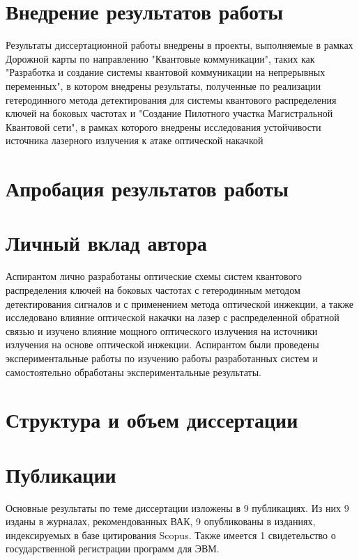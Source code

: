 \section*{Внедрение результатов работы}
Результаты диссертационной работы внедрены в проекты, выполняемые в рамках Дорожной карты по направлению "Квантовые коммуникации", таких как  "Разработка и создание системы квантовой коммуникации на непрерывных переменных", в котором внедрены результаты, полученные по реализации гетеродинного метода детектирования для системы квантового распределения ключей на боковых частотах  и "Создание Пилотного участка Магистральной Квантовой сети", в рамках которого внедрены исследования устойчивости источника лазерного излучения к атаке оптической накачкой

\section*{Апробация результатов работы}
\section*{Личный вклад автора}
Аспирантом лично разработаны оптические схемы систем квантового распределения ключей на боковых частотах с гетеродинным методом детектирования сигналов и с применением метода оптической инжекции, а также исследовано влияние оптической накачки на лазер с распределенной обратной связью и изучено влияние мощного оптического излучения на источники излучения на основе оптической инжекции. Аспирантом были проведены экспериментальные работы по изучению работы разработанных систем и самостоятельно обработаны экспериментальные результаты.
\section*{Структура и объем диссертации}
\section*{Публикации}
Основные результаты по теме диссертации изложены в 9 публикациях. Из них 9 изданы в журналах, рекомендованных ВАК, 9 опубликованы в изданиях, индексируемых в базе цитирования Scopus. Также имеется 1 свидетельство о государственной регистрации программ для ЭВМ.\\

